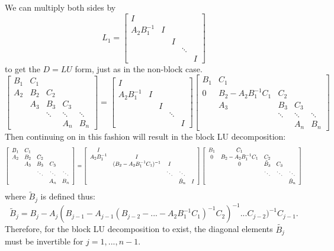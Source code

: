 \documentclass[12pt]{article}
\newcommand\scalemath[2]{\scalebox{#1}{\mbox{\ensuremath{\displaystyle #2}}}}
\numberwithin{equation}{section}
\newcommand{\A}{\mathcal{A}}
\begin{document}
\begin{enumerate}
We can multiply both sides by
$$L_1=\left[\begin{array}{ccccc}I&&&&\\A_2B_1^{-1}&I&&&\\&&I&&\\&&&\ddots&\\&&&&I\end{array}\right]$$
to get the $D=LU$ form, just as in the non-block case.
$$\left[\begin{array}{ccccc}B_1&C_1&&&\\A_2&B_2&C_2&&\\&A_3&B_3&C_3&\\&&\ddots&\ddots&\ddots\\&&&A_n&B_n\end{array}\right]=\left[\begin{array}{ccccc}I&&&&\\A_2B_1^{-1}&I&&&\\&&I&&\\&&&\ddots&\\&&&&I\end{array}\right]\left[\begin{array}{ccccc}B_1&C_1&&&\\0&B_2-A_2B_1^{-1}C_1&C_2&&\\&A_3&B_3&C_3&\\&&\ddots&\ddots&\ddots\\&&&A_n&B_n\end{array}\right]$$
Then continuing on in this fashion will result in the block LU decomposition:
\[\scalemath{0.8}{\left[\begin{array}{ccccc}B_1&C_1&&&\\A_2&B_2&C_2&&\\&A_3&B_3&C_3&\\&&\ddots&\ddots&\ddots\\&&&A_n&B_n\end{array}\right]=\left[\begin{array}{ccccc}I&&&&\\A_2B_1^{-1}&I&&&\\&(B_2-A_2B_1^{-1}C_1)^{-1}&I&&\\&&\ddots&\ddots&\\&&&\tilde{B}_n&I\end{array}\right]\left[\begin{array}{ccccc}B_1&C_1&&&\\0&B_2-A_2B_1^{-1}C_1&C_2&&\\&0&\tilde{B}_3&C_3&\\&&\ddots&\ddots&\ddots\\&&&&\tilde{B}_n\end{array}\right]}\]
where $\tilde{B}_j$ is defined thus:
$$\tilde{B}_j=B_j-A_j(B_{j-1}-A_{j-1}(B_{j-2}-...-A_2B_1^{-1}C_1)^{-1}C_2)^{-1}...C_{j-2})^{-1}C_{j-1}.$$
Therefore, for the block LU decomposition to exist, the diagonal elements $\tilde{B_j}$ must be invertible for $j=1,...,n-1$.\\


\end{enumerate}
\end{document}
